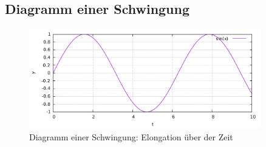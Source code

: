 




%
%	






\subsection{Diagramm einer Schwingung} \label{subsec:diagramm_schwingung}

\begin{figure}[h!]


	\includegraphics[width=0.9\textwidth]{Pictures/schwingung}

	\caption{Diagramm einer Schwingung: Elongation über der Zeit}

	
\end{figure}

